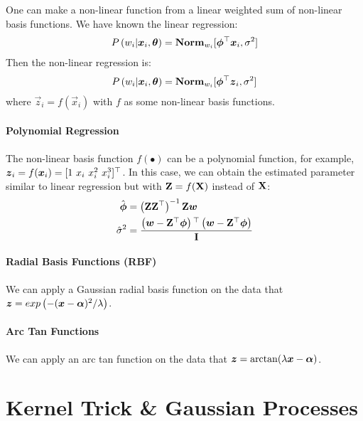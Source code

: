 One can make a non-linear function from a linear weighted sum of non-linear basis functions. We have known the linear regression:
\begin{align*}
	P\left(w_i|\boldsymbol{x}_i,\boldsymbol{\theta}\right)=\mathbf{Norm}_{w_i}[\boldsymbol{\phi}{}^\top\boldsymbol{x}_i,\sigma^2]
\end{align*}
Then the non-linear regression is:
\begin{align*}
	P\left(w_i|\boldsymbol{x}_i,\boldsymbol{\theta}\right)=\mathbf{Norm}_{w_i}[\boldsymbol{\phi}{}^\top\boldsymbol{z}_i,\sigma^2]
\end{align*}
where $\vec{z}_i=f(\vec{x}_i)$ with $f$ as some non-linear basis functions.

\paragraph{Polynomial Regression}

The non-linear basis function $f(\bullet)$ can be a polynomial function, for example, $\vec{z}_i=f(\vec{x}_i)=[1\ x_i\ x_i^2\ x_i^3]\T$. In this case, we can obtain the estimated parameter similar to linear regression but with $\mathbf{Z}=f(\mathbf{X})$ instead of $\mathbf{X}$:
\begin{align*}
	\hat{\boldsymbol{\phi}}&=\left(\mathbf{Z}\mathbf{Z}{}^\top\right)^{-1}\mathbf{Z}\boldsymbol{w} \\
	\hat{\sigma}^2&=\frac{\left(\boldsymbol{w}-\mathbf{Z}{}^\top\boldsymbol{\phi}\right){}^\top\left(\boldsymbol{w}-\mathbf{Z}{}^\top\boldsymbol{\phi}\right)}{\mathbf{I}}
\end{align*}

\paragraph{Radial Basis Functions (RBF)} We can apply a Gaussian radial basis function on the data that $\boldsymbol{z}=exp\left(-(\boldsymbol{x}-\boldsymbol{\alpha})^2/\lambda\right)$.

\paragraph{Arc Tan Functions} We can apply an arc tan function on the data that $\boldsymbol{z}=\arctan(\lambda\boldsymbol{x}-\boldsymbol{\alpha})$.

\section{Kernel Trick \& Gaussian Processes}

